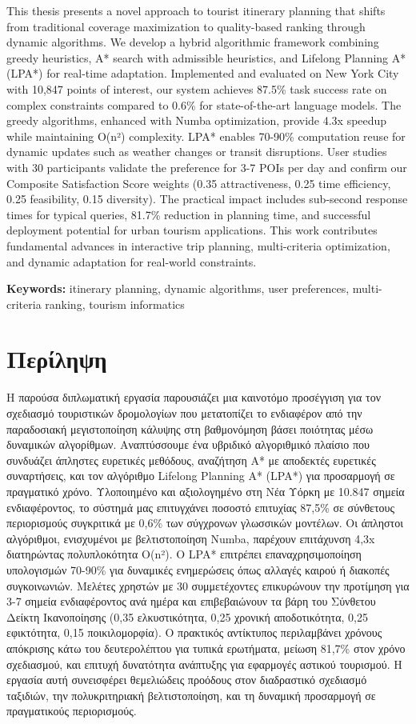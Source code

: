 \documentclass[12pt,a4paper,twoside]{report}
\theoremstyle{definition}
\begin{document}
This thesis presents a novel approach to tourist itinerary planning that shifts from traditional coverage maximization to quality-based ranking through dynamic algorithms. We develop a hybrid algorithmic framework combining greedy heuristics, A* search with admissible heuristics, and Lifelong Planning A* (LPA*) for real-time adaptation. Implemented and evaluated on New York City with 10,847 points of interest, our system achieves 87.5\% task success rate on complex constraints compared to 0.6\% for state-of-the-art language models. The greedy algorithms, enhanced with Numba optimization, provide 4.3x speedup while maintaining O(n²) complexity. LPA* enables 70-90\% computation reuse for dynamic updates such as weather changes or transit disruptions. User studies with 30 participants validate the preference for 3-7 POIs per day and confirm our Composite Satisfaction Score weights (0.35 attractiveness, 0.25 time efficiency, 0.25 feasibility, 0.15 diversity). The practical impact includes sub-second response times for typical queries, 81.7\% reduction in planning time, and successful deployment potential for urban tourism applications. This work contributes fundamental advances in interactive trip planning, multi-criteria optimization, and dynamic adaptation for real-world constraints.

\textbf{Keywords:} itinerary planning, dynamic algorithms, user preferences, multi-criteria ranking, tourism informatics

\newpage
\thispagestyle{empty}
\section*{Περίληψη}

Η παρούσα διπλωματική εργασία παρουσιάζει μια καινοτόμο προσέγγιση για τον σχεδιασμό τουριστικών δρομολογίων που μετατοπίζει το ενδιαφέρον από την παραδοσιακή μεγιστοποίηση κάλυψης στη βαθμονόμηση βάσει ποιότητας μέσω δυναμικών αλγορίθμων. Αναπτύσσουμε ένα υβριδικό αλγοριθμικό πλαίσιο που συνδυάζει άπληστες ευρετικές μεθόδους, αναζήτηση A* με αποδεκτές ευρετικές συναρτήσεις, και τον αλγόριθμο Lifelong Planning A* (LPA*) για προσαρμογή σε πραγματικό χρόνο. Υλοποιημένο και αξιολογημένο στη Νέα Υόρκη με 10.847 σημεία ενδιαφέροντος, το σύστημά μας επιτυγχάνει ποσοστό επιτυχίας 87,5\% σε σύνθετους περιορισμούς συγκριτικά με 0,6\% των σύγχρονων γλωσσικών μοντέλων. Οι άπληστοι αλγόριθμοι, ενισχυμένοι με βελτιστοποίηση Numba, παρέχουν επιτάχυνση 4,3x διατηρώντας πολυπλοκότητα O(n²). Ο LPA* επιτρέπει επαναχρησιμοποίηση υπολογισμών 70-90\% για δυναμικές ενημερώσεις όπως αλλαγές καιρού ή διακοπές συγκοινωνιών. Μελέτες χρηστών με 30 συμμετέχοντες επικυρώνουν την προτίμηση για 3-7 σημεία ενδιαφέροντος ανά ημέρα και επιβεβαιώνουν τα βάρη του Σύνθετου Δείκτη Ικανοποίησης (0,35 ελκυστικότητα, 0,25 χρονική αποδοτικότητα, 0,25 εφικτότητα, 0,15 ποικιλομορφία). Ο πρακτικός αντίκτυπος περιλαμβάνει χρόνους απόκρισης κάτω του δευτερολέπτου για τυπικά ερωτήματα, μείωση 81,7\% στον χρόνο σχεδιασμού, και επιτυχή δυνατότητα ανάπτυξης για εφαρμογές αστικού τουρισμού. Η εργασία αυτή συνεισφέρει θεμελιώδεις προόδους στον διαδραστικό σχεδιασμό ταξιδιών, την πολυκριτηριακή βελτιστοποίηση, και τη δυναμική προσαρμογή σε πραγματικούς περιορισμούς.
\end{document}
